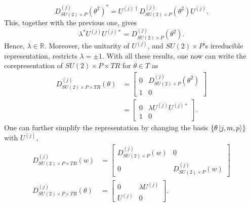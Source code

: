 \documentclass[preprint, 12pt]{revtex4-2}
\numberwithin{equation}{section}
\begin{document}
\begin{equation}
    D^{(j)}_{SU(2)\times P}(\theta^{2})^\ast = U^{(j)\dagger}D^{(j)}_{SU(2)\times P}(\theta^{2})U^{(j)}.
\end{equation}
This, together with the previous one, gives
\begin{equation}
    \lambda^\ast U^{(j)}U^{(j)\ast} = D^{(j)}_{SU(2)\times P}(\theta^{2}).
\end{equation}
Hence, $\lambda\in\mathbb{R}$. Moreover, the unitarity of $U^{(j)}$, and $SU(2)\times P$'s irreducible representation, restricts $\lambda = \pm 1$. With all these results, one now can write the corepresentation of $SU(2)\times P\times TR$ for $\theta\in T$ as
\begin{equation}
    \begin{aligned}
        D_{SU(2)\times P\times TR}^{(j)}(\theta) &= 
        \begin{bmatrix}
            0 & D^{(j)}_{SU(2)\times P}(\theta^2) \\
            1 & 0
        \end{bmatrix} \\
        &= \begin{bmatrix}
            0 & \lambda U^{(j)}U^{(j)\ast} \\
            1 & 0
        \end{bmatrix}.
    \end{aligned}
\end{equation}
One can further simplify the representation by changing the basis $\{\theta\ket{j, m, p}\}$ with $U^{(j)}$,
\begin{equation}
    \begin{aligned}
        D_{SU(2)\times P\times TR}^{(j)}(w) &= 
        \begin{bmatrix}
            D^{(j)}_{SU(2)\times P}(w) & 0 \\
            0 & D^{(j)}_{SU(2)\times P}(w)
        \end{bmatrix} \\
        D_{SU(2)\times P\times TR}^{(j)}(\theta) &= 
        \begin{bmatrix}
            0 & \lambda U^{(j)} \\
            U^{(j)} & 0
        \end{bmatrix}.
    \end{aligned}
\end{equation}
\end{document}
